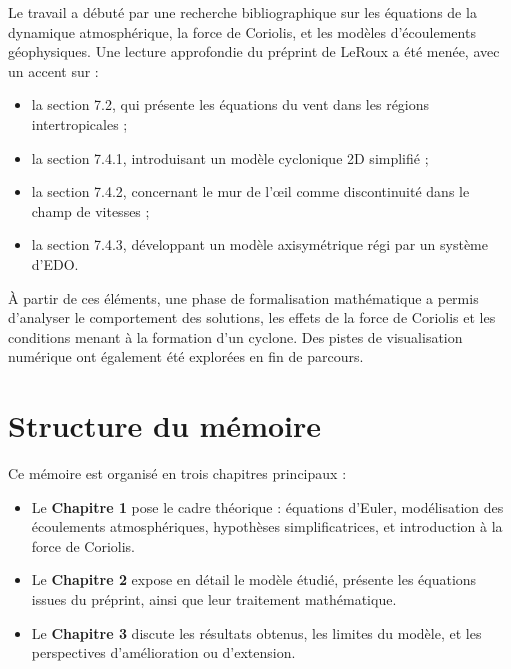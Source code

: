 Le travail a débuté par une recherche bibliographique sur les équations de la dynamique atmosphérique, la force de Coriolis, et les modèles d’écoulements géophysiques. Une lecture approfondie du préprint de LeRoux \cite{leroux2014modelisation} a été menée, avec un accent sur :
\begin{itemize}
    \item la section 7.2, qui présente les équations du vent dans les régions intertropicales ;
    \item la section 7.4.1, introduisant un modèle cyclonique 2D simplifié ;
    \item la section 7.4.2, concernant le mur de l’œil comme discontinuité dans le champ de vitesses ;
    \item la section 7.4.3, développant un modèle axisymétrique régi par un système d’EDO.
\end{itemize}

À partir de ces éléments, une phase de formalisation mathématique a permis d’analyser le comportement des solutions, les effets de la force de Coriolis et les conditions menant à la formation d’un cyclone. Des pistes de visualisation numérique ont également été explorées en fin de parcours.

\section*{Structure du mémoire}

Ce mémoire est organisé en trois chapitres principaux :
\begin{itemize}
    \item Le \textbf{Chapitre 1} pose le cadre théorique : équations d’Euler, modélisation des écoulements atmosphériques, hypothèses simplificatrices, et introduction à la force de Coriolis.
    \item Le \textbf{Chapitre 2} expose en détail le modèle étudié, présente les équations issues du préprint, ainsi que leur traitement mathématique.
    \item Le \textbf{Chapitre 3} discute les résultats obtenus, les limites du modèle, et les perspectives d’amélioration ou d’extension.
\end{itemize}
